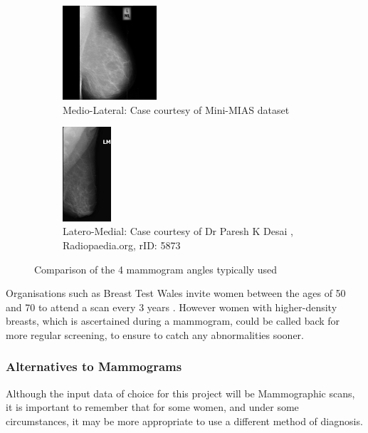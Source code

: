 \begin{figure}[H]
\begin{center}
    \begin{subfigure}[t]{0.45\textwidth}
      \centering
          \includegraphics[height=3.5cm]{Chapter1/background-img/ML.jpg}
          \caption{Medio-Lateral: Case courtesy of Mini-MIAS dataset \cite{Suckling_1994}}
          \label{fig:LM}
    \end{subfigure}
    \hfill
    \begin{subfigure}[t]{0.45\textwidth}
      \centering
          \includegraphics[height=3.5cm]{Chapter1/background-img/LM.jpg}
          \caption{Latero-Medial: Case courtesy of Dr Paresh K Desai , Radiopaedia.org, rID: 5873}
          \label{fig:ML}
    \end{subfigure}
    \hspace*{\fill}
  \caption{Comparison of the 4 mammogram angles typically used}
  \label{fig:scan-angles}
\end{center}
\end{figure}

Organisations such as Breast Test Wales invite women between the ages of 50 and 70 to attend a scan every 3 years \cite{Informed_Choice_about_Cancer_Screening_2013}. However women with higher-density breasts, which is ascertained during a mammogram, could be called back for more regular screening, to ensure to catch any abnormalities sooner.

\subsubsection{Alternatives to Mammograms}

Although the input data of choice for this project will be Mammographic scans, it is important to remember that for some women, and under some circumstances, it may be more appropriate to use a different method of diagnosis.

